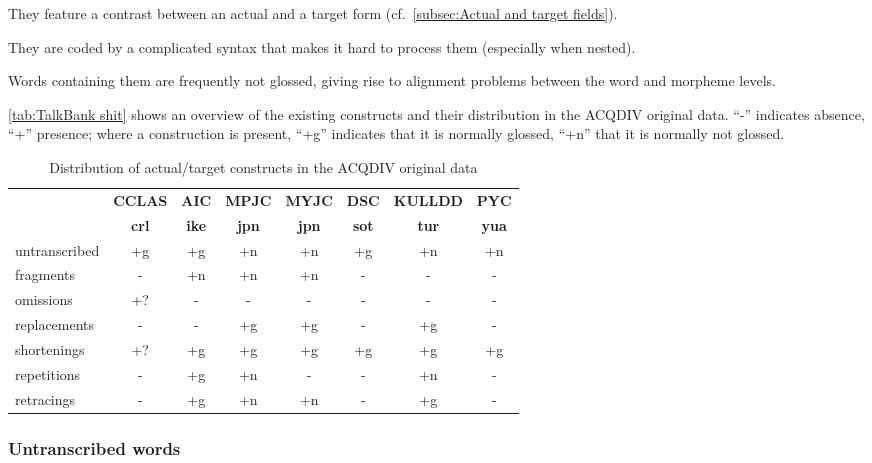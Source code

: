 \documentclass[a4paper, 11pt]{book}
\begin{document}
\begin{itemize*}
	\item They feature a contrast between an actual and a target form (cf.\ \autoref{subsec:Actual and target fields}).
	\item They are coded by a complicated syntax that makes it hard to process them (especially when nested).
	\item Words containing them are frequently not glossed, giving rise to alignment problems between the word and morpheme levels.
\end{itemize*}

\autoref{tab:TalkBank shit} shows an overview of the existing constructs and their distribution in the ACQDIV original data. “-” indicates absence, “+” presence; where a construction is present, “+g” indicates that it is normally glossed, “+n” that it is normally not glossed.

\begin{table}
	\centering
	\begin{tabular}{lccccccc}
		\toprule
		& \textbf{CCLAS} & \textbf{AIC} & \textbf{MPJC} & \textbf{MYJC} & \textbf{DSC} & \textbf{KULLDD} & \textbf{PYC} \\
								  & \textbf{crl} & \textbf{ike} & \textbf{jpn} & \textbf{jpn} & \textbf{sot} & \textbf{tur} & \textbf{yua} \\
		\midrule
				   untranscribed 	& +g 		& +g 			& +n 			& +n 			& +g 			& +n 			& +n \\
				   fragments		& - 		& +n 			& +n 			& +n 			& - 			& - 			& - \\
				   omissions		& +? 		& - 			& - 			& - 			& - 			& - 			& - \\
				   replacements 	& - 		& - 			& +g 			& +g 			& - 			& +g 			& - \\
				   shortenings 		& +?		& +g 			& +g 			& +g 	 		& +g			& +g 			& +g \\
				   repetitions 		& - 		& +g 			& +n 			& - 			& - 			& +n 			& - \\
				   retracings 		& - 		& +g 			& +n 			& +n 			& - 			& +g 			& - \\
		\bottomrule
	\end{tabular}
	\caption{Distribution of actual/target constructs in the ACQDIV original data}
	\label{tab:TalkBank shit}
\end{table}

\subsubsection*{Untranscribed words}
\end{document}
